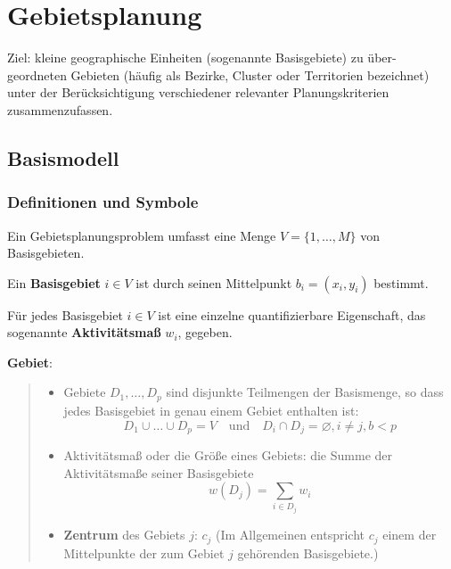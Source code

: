 \chapter{Gebietsplanung} %
\label{cha:gebietsplanung}

  \par Ziel: kleine geographische Einheiten (sogenannte Basisgebiete) zu über- geordneten Gebieten (häufig als Bezirke, Cluster oder Territorien bezeichnet) unter der Berücksichtigung verschiedener relevanter Planungskriterien zusammenzufassen.

  \section{Basismodell} %
  \label{sec:basismodell}

    \subsection{Definitionen und Symbole} %
    \label{sub:definitionen_und_symbole}

      \par Ein Gebietsplanungsproblem umfasst eine Menge $V = \{1, \dots, M\}$ von Basisgebieten.

    \par Ein \textbf{Basisgebiet} $i \in V$ ist durch seinen Mittelpunkt $b_i = (x_i, y_i)$ bestimmt.

    \par Für jedes Basisgebiet $i \in V$ ist eine einzelne quantifizierbare Eigenschaft, das sogenannte \textbf{Aktivitätsmaß} $w_i$, gegeben. \\

    \par \textbf{Gebiet}:

    \begin{quote}
       \begin{itemize}
          \item Gebiete $D_1, \dots, D_p$ sind disjunkte Teilmengen der Basismenge, so dass jedes Basisgebiet in genau einem Gebiet enthalten ist:
            \begin{equation*}
              D_1 \cup \dots \cup D_p = V \quad \text{und} \quad D_i \cap D_j = \varnothing, i \neq j, b < p
            \end{equation*}
          
          \item Aktivitätsmaß oder die Größe eines Gebiets: die Summe der Aktivitätsmaße seiner Basisgebiete
            \begin{equation*}
              w(D_j) = \sum_{i \in D_j}w_i
            \end{equation*}

          \item \textbf{Zentrum} des Gebiets $j$: $c_j$ (Im Allgemeinen entspricht $c_j$ einem der Mittelpunkte der zum Gebiet $j$ gehörenden Basisgebiete.)
        \end{itemize}
    \end{quote}
     

